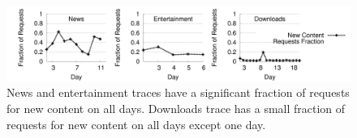 

 \begin{figure}[t]
\begin{center}
	\includegraphics[scale=0.43]{graphSet1/akamaidata/churn.pdf}
\end{center}
\vspace{-0.3in}
\caption{News and entertainment traces have a significant fraction of requests for new content on all days. Downloads trace has a small fraction of requests for new content on all days except one day.}
\vspace{-0.15in}
\label{fig:akamaichurn}
\end{figure}
\eat
